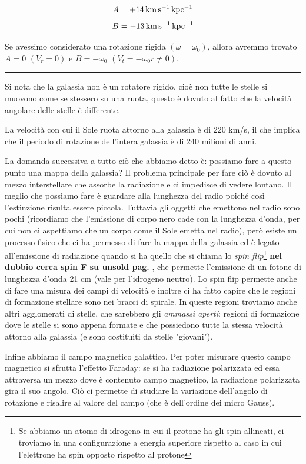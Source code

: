 $$A=\rm +14 \, km \, s^{-1} \, kpc^{-1}$$
$$B=\rm -13 \, km \, s^{-1} \, kpc^{-1}$$

Se avessimo considerato una rotazione rigida $(\omega=\omega_0)$, allora avremmo trovato $A=0$ $(V_r=0)$ e $B=-\omega_0$ $(V_t=-\omega_0 r \neq 0)$.

\rule[7pt]{\linewidth}{0.4pt}

Si nota che la galassia non è un rotatore rigido, cioè non tutte le stelle si muovono come se stessero su una ruota, questo è dovuto al fatto che la velocità angolare delle stelle è differente.

La velocità con cui il Sole ruota attorno alla galassia è di 220 km/s, il che implica che il periodo di rotazione dell'intera galassia è di 240 milioni di anni.

La domanda successiva a tutto ciò che abbiamo detto è: possiamo fare a questo punto una mappa della galassia? Il problema principale per fare ciò è dovuto al mezzo interstellare che assorbe la radiazione e ci impedisce di vedere lontano. Il meglio che possiamo fare è guardare alla lunghezza del radio poiché così l'estinzione risulta essere piccola. Tuttavia gli oggetti che emettono nel radio sono pochi (ricordiamo che l'emissione di corpo nero cade con la lunghezza d'onda, per cui non ci aspettiamo che un corpo come il Sole emetta nel radio), però esiste un processo fisico che ci ha permesso di fare la mappa della galassia ed è legato all'emissione di radiazione quando si ha quello che si chiama lo \textit{spin flip}\footnote{Se abbiamo un atomo di idrogeno in cui il protone ha gli spin allineati, ci troviamo in una configurazione a energia superiore rispetto al caso in cui l'elettrone ha spin opposto rispetto al protone} \textbf{nel dubbio cerca spin F su unsold pag. }, che permette l'emissione di un fotone di lunghezza d'onda 21 cm (vale per l'idrogeno neutro). Lo spin flip permette anche di fare una misura dei campi di velocità e inoltre ci ha fatto capire che le regioni di formazione stellare sono nei bracci di spirale. In queste regioni troviamo anche altri agglomerati di stelle, che sarebbero gli \textit{ammassi aperti}: regioni di formazione dove le stelle si sono appena formate e che possiedono tutte la stessa velocità attorno alla galassia (e sono costituiti da stelle "giovani").

Infine abbiamo il campo magnetico galattico. Per poter misurare questo campo magnetico si sfrutta l'effetto Faraday: se si ha radiazione polarizzata ed essa attraversa un mezzo dove è contenuto campo magnetico, la radiazione polarizzata gira il suo angolo. Ciò ci permette di studiare la variazione dell'angolo di rotazione e risalire al valore del campo (che è dell'ordine dei micro Gauss).

